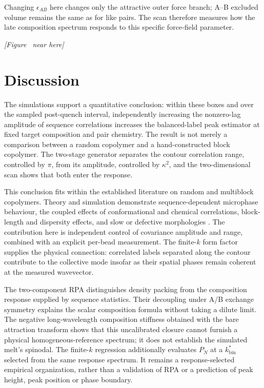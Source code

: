 \documentclass[pdflatex,sn-nature,onecolumn]{sn-jnl}
\newcommand{\figurecallout}[1]{%
  \refstepcounter{figure}\label{#1}%
  \begin{center}\textit{[Figure \thefigure\ near here]}\end{center}}
\begin{document}
Changing $\epsilon_{AB}$ here changes only the attractive outer force branch; A--B excluded volume remains the same as for like pairs. The scan therefore measures how the late composition spectrum responds to this specific force-field parameter.

\figurecallout{fig:cross_attraction}

\section{Discussion}

The simulations support a quantitative conclusion: within these boxes and over the sampled post-quench interval, independently increasing the nonzero-lag amplitude of sequence correlations increases the balanced-label peak estimator at fixed target composition and pair chemistry. The result is not merely a comparison between a random copolymer and a hand-constructed block copolymer. The two-stage generator separates the contour correlation range, controlled by $\pi$, from its amplitude, controlled by $\kappa^2$, and the two-dimensional scan shows that both enter the response.

This conclusion fits within the established literature on random and multiblock copolymers. Theory and simulation demonstrate sequence-dependent microphase behaviour, the coupled effects of conformational and chemical correlations, block-length and dispersity effects, and slow or defective morphologies \cite{FredricksonMilnerLeibler1992,Gavrilov2011CPL,Govorun2017,MaoSpakowitz2016,Patyukova2021,Rudyak2022,Steinmuller2012Morph}. The contribution here is independent control of covariance amplitude and range, combined with an explicit per-bead measurement. The finite-$k$ form factor supplies the physical connection: correlated labels separated along the contour contribute to the collective mode insofar as their spatial phases remain coherent at the measured wavevector.

The two-component RPA distinguishes density packing from the composition response supplied by sequence statistics. Their decoupling under A/B exchange symmetry explains the scalar composition formula without taking a dilute limit. The negative long-wavelength composition stiffness obtained with the bare attraction transform shows that this uncalibrated closure cannot furnish a physical homogeneous-reference spectrum; it does not establish the simulated melt's spinodal. The finite-$k$ regression additionally evaluates $P_N$ at a $k_{\mathrm{bin}}^*$ selected from the same response spectrum. It remains a response-selected empirical organization, rather than a validation of RPA or a prediction of peak height, peak position or phase boundary.
\end{document}
